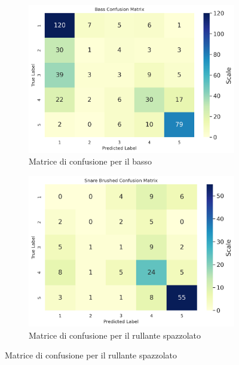 \begin{figure}[h!]
	\centering
	\begin{subfigure}{.5\linewidth}
		\includegraphics[width=\linewidth]{./immagini/second_classification/cb_cm.png} 
		\caption{Matrice di confusione per il basso}
		\label{fig:cm_2a}
	\end{subfigure}\hfill
	\begin{subfigure}{.5\linewidth}
		\includegraphics[width=\linewidth]{./immagini/second_classification/sn_brushed_cm.png}
		\caption{Matrice di confusione per il rullante spazzolato}
		\label{fig:cm_2b}
	\end{subfigure}
	

\end{figure}
